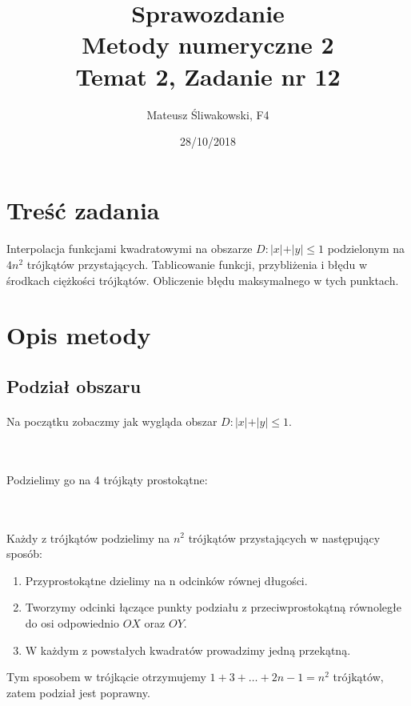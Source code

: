 \documentclass{article}
\title{Sprawozdanie \\Metody numeryczne 2 \\\textbf{Temat 2, Zadanie nr 12}}
\date{28/10/2018}
\author{Mateusz Śliwakowski, F4}
\begin{document}
  \maketitle
 	  \newpage

\section{Treść zadania}
\paragraph{}
Interpolacja funkcjami kwadratowymi na obszarze $D: \vert x \vert + \vert y \vert \leq 1$ podzielonym na $4n^2$ trójkątów przystających. Tablicowanie funkcji, przybliżenia i błędu w środkach ciężkości trójkątów. Obliczenie błędu maksymalnego w tych punktach.
\section{Opis metody}
\subsection{Podział obszaru}
\paragraph{}
Na początku zobaczmy jak wygląda obszar $D: \vert x \vert + \vert y \vert \leq 1$.\\\\
\\
Podzielimy go na 4 trójkąty prostokątne:\\\\
\\
Każdy z trójkątów podzielimy na $n^2$ trójkątów przystających w następujący sposób:
\begin{enumerate}
\item Przyprostokątne dzielimy na n odcinków równej długości.
\item Tworzymy odcinki łączące punkty podziału z przeciwprostokątną równoległe do osi odpowiednio $OX$ oraz $OY$.
\item W każdym z powstałych kwadratów prowadzimy jedną przekątną.
\end{enumerate}
Tym sposobem w trójkącie otrzymujemy $1 + 3 + \dots + 2n-1 = n^2$ trójkątów, zatem podział jest poprawny.
\end{document}
